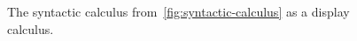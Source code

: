\begin{figure}
\begin{mdframed}
    \vspace*{\baselineskip}
    \begin{pfbox}
      \doubleLine{}
      \doubleLine{}
    \end{pfbox}
    \vspace*{\baselineskip}
  \end{mdframed}
  \caption{
    The syntactic calculus from~\autoref{fig:syntactic-calculus} as a
    display calculus.}%
  \label{fig:display-calculus}
\end{figure}

